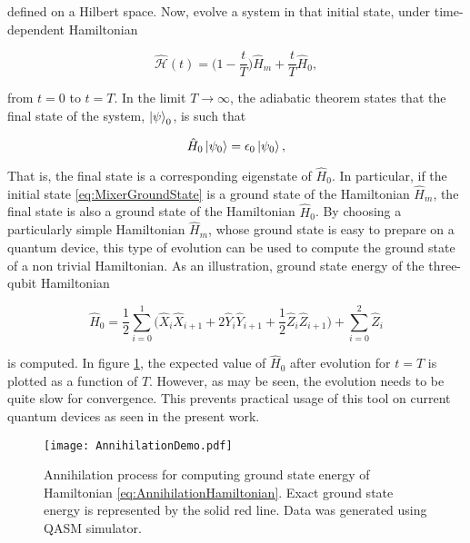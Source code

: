 \noindent defined on a Hilbert space. Now, evolve a system in that initial state, under time-dependent Hamiltonian

\begin{equation}
    \hat{\mathcal{H}}(t) = \bigg(1-\frac{t}{T}\bigg)\hat{H}_m + \frac{t}{T}\hat{H}_0,
    \label{eq:AdiabaticHamiltonian}
\end{equation}

\noindent from $t=0$ to $t=T$. In the limit $T \rightarrow \infty$, the adiabatic theorem states that the final state of the system, $\ket{\psi}_0$, is such that 

\begin{equation}
    \hat{H}_0 \ket{\psi_0} = \epsilon_0 \ket{\psi_0},
    \label{eq:MixerGroundState}
\end{equation}

That is, the final state is a corresponding eigenstate of $\hat{H}_0$. In particular, if the initial state \ref{eq:MixerGroundState} is a ground state of the Hamiltonian $\hat{H}_m$, the final state is also a ground state of the Hamiltonian $\hat{H}_0$. By choosing a particularly simple Hamiltonian $\hat{H}_m$, whose ground state is easy to prepare on a quantum device, this type of evolution can be used to compute the ground state of a non trivial Hamiltonian. As an illustration, ground state energy of the three-qubit Hamiltonian

\begin{equation}
    \hat{H}_0 = \frac{1}{2}\sum_{i=0}^{1} \bigg(\hat{X}_i\hat{X}_{i+1} + 2\hat{Y}_i\hat{Y}_{i+1} + \frac{1}{2}\hat{Z}_i\hat{Z}_{i+1}\bigg) + \sum_{i=0}^{2} \hat{Z}_i
    \label{eq:AnnihilationHamiltonian}
\end{equation}

\noindent is computed. In figure \ref{fig:AnnihilationProcess}, the expected value of $\hat{H}_0$ after evolution for $t=T$ is plotted as a function of $T$. However, as may be seen, the evolution needs to be quite slow for convergence. This prevents practical usage of this tool on current quantum devices as seen in the present work.

\begin{figure}
    \centering
    \texttt{[image: AnnihilationDemo.pdf]}
    \caption{Annihilation process for computing ground state energy of Hamiltonian \ref{eq:AnnihilationHamiltonian}. Exact ground state energy is represented by the solid red line. Data was generated using QASM simulator.}
    \label{fig:AnnihilationProcess}
\end{figure}

